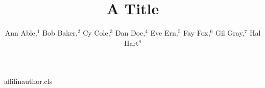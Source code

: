 \begin{filecontents*}[overwrite]{affilinauthor.cls}
\RequirePackage{xcolor}
\def\affilfont{\small}
\def\affil#1{\par{\reset@font\affilfont#1\par}}
\def\address#1{\par{\reset@font\affilfont#1\par}}
\def\@maketitle{\newpage{\Large\bfseries\@title\par}\vskip1em\noindent{\bfseries\@author\par}\vskip1em}
\end{filecontents*}
\documentclass{affilinauthor}

\title{A Title}
\author{Ann Able,$^1$ Bob Baker,$^2$ Cy Cole,$^3$ Dan Doe,$^4$ Eve Ern,$^5$ Fay Fox,$^6$ Gil Gray,$^7$ Hal Hart$^8$
}
\maketitle
Body.

